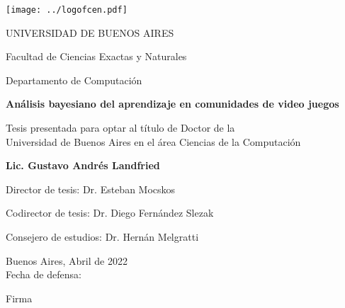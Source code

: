 \documentclass[a4paper,11pt]{book}
\author{Gustavo Landfried}
\makeatletter
\renewcommand{\frontmatter}{\cleardoublepage\@mainmatterfalse}
\theoremstyle{definition}
\newcommand{\TITULO}[0]{An\'alisis bayesiano del aprendizaje en comunidades de video juegos}
\makeatother
\begin{document}
\deactivatequoting %

\frontmatter
{}

\begin{center}

\texttt{[image: ../logofcen.pdf]}

\medskip
UNIVERSIDAD DE BUENOS AIRES

Facultad de Ciencias Exactas y Naturales

Departamento de Computaci\'on


\vspace{3cm}

\textbf{\LARGE \TITULO}

\vspace{1cm}



Tesis presentada para optar al t\'itulo de Doctor de la \\
Universidad de Buenos Aires en el \'area Ciencias de la Computaci\'on

\vspace{2.5cm}

\textbf{Lic. Gustavo Andr\'es Landfried}

\end{center}

\vspace{2.5cm}

\noindent Director de tesis: Dr. Esteban Mocskos

\noindent Codirector de tesis: Dr. Diego Fern\'andez Slezak

\noindent Consejero de estudios: Dr. Hern\'an Melgratti \\


\vspace{0.5cm}

\noindent Buenos Aires, Abril de 2022\\

\noindent Fecha de defensa: \\%

\vspace{0.5cm}

\hspace*{0pt}\hfill Firma \hspace{2cm}
\thispagestyle{empty}
\newpage
\end{document}
